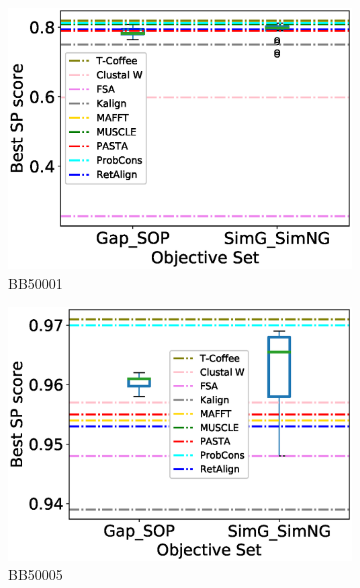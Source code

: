 \begin{figure}[!htbp]
\begin{adjustwidth}{-1.5cm}{-1cm}
		\begin{subfigure}{0.22\textwidth}
			\includegraphics[width=\columnwidth]{Figure/summary/precomputedInit/Balibase/BB50001_objset_pairs_rank_2}
			\caption{BB50001}
		\end{subfigure}	
		\begin{subfigure}{0.22\textwidth}
			\includegraphics[width=\columnwidth]{Figure/summary/precomputedInit/Balibase/BB50005_objset_pairs_rank_2}
			\caption{BB50005}
		\end{subfigure}
		\begin{subfigure}{0.22\textwidth}

\end{subfigure}
\end{adjustwidth}
\end{figure}
